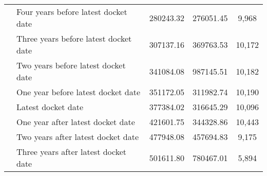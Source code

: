 \begin{tabular}{llccc}
 & Four years before latest docket date & 280243.32 & 276051.45 & 9,968 \\
 & Three years before latest docket date & 307137.16 & 369763.53 & 10,172 \\
 & Two years before latest docket date & 341084.08 & 987145.51 & 10,182 \\
 & One year before latest docket date & 351172.05 & 311982.74 & 10,190 \\
 & Latest docket date & 377384.02 & 316645.29 & 10,096 \\
 & One year after latest docket date & 421601.75 & 344328.86 & 10,443 \\
 & Two years after latest docket date & 477948.08 & 457694.83 & 9,175 \\
 & Three years after latest docket date & 501611.80 & 780467.01 & 5,894 \\
\cline{1-5}
\bottomrule
\end{tabular}
